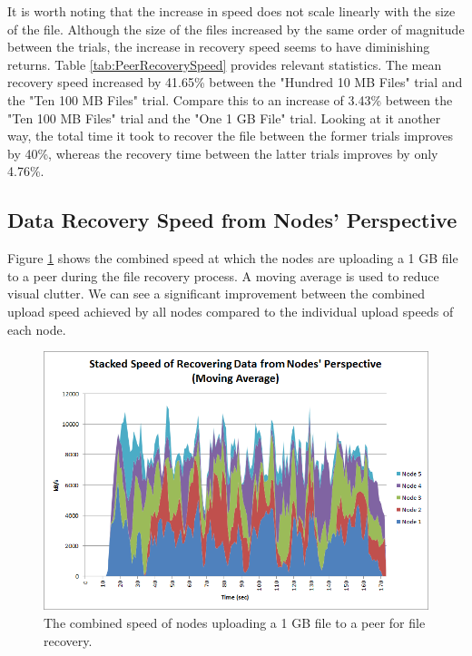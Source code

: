 \documentclass[12pt]{report}
\begin{document}
It is worth noting that the increase in speed does not scale linearly with the size of the file. Although the size of the files increased by the same order of magnitude between the trials, the increase in recovery speed seems to have diminishing returns. Table \ref{tab:PeerRecoverySpeed} provides relevant statistics. The mean recovery speed increased by 41.65\% between the "Hundred 10 MB Files" trial and the "Ten 100 MB Files" trial. Compare this to an increase of 3.43\% between the "Ten 100 MB Files" trial and the "One 1 GB File" trial. Looking at it another way, the total time it took to recover the file between the former trials improves by 40\%, whereas the recovery time between the latter trials improves by only 4.76\%.

\subsection{Data Recovery Speed from Nodes' Perspective}

Figure \ref{fig:NodeRecoverySpeed} shows the combined speed at which the nodes are uploading a 1 GB file to a peer during the file recovery process. A moving average is used to reduce visual clutter. We can see a significant improvement between the combined upload speed achieved by all nodes compared to the individual upload speeds of each node.

\begin{figure}
  \centerline{\includegraphics[scale=1]{figures/NodeRecoverySpeed}}
  \caption{The combined speed of nodes uploading a 1 GB file to a peer for file recovery. \label{fig:NodeRecoverySpeed}}
\end{figure}
\end{document}
